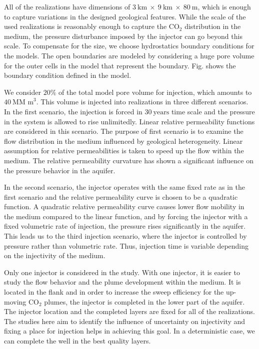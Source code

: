 All of the realizations have dimensions of $3~\mbox{km}~\times~9~\mbox{km}~\times~80~\mbox{m}$, which is enough to capture variations in the designed geological features. While the scale of the used realizations is reasonably enough to capture the $\mbox{CO}_2$ distribution in the medium, the pressure disturbance imposed by the injector can go beyond this scale. To compensate for the size, we choose hydrostatics boundary conditions for the models. The open boundaries are modeled by considering a huge pore volume for the outer cells in the model that represent the boundary. Fig. shows the boundary condition defined in the model.

We consider $20\%$ of the total model pore volume for injection, which amounts to $40~\mbox{MM m}^3$. This volume is injected into realizations in three different scenarios. In the first scenario, the injection is forced in $30~\mbox{years}$ time scale and the pressure in the system is allowed to rise unlimitedly. Linear relative permeability functions are considered in this scenario. The purpose of first scenario is to examine the flow distribution in the medium influenced by geological heterogeneity. Linear assumption for relative permeabilities is taken to speed up the flow within the medium. The relative permeability curvature has shown a significant influence on the pressure behavior in the  aquifer. 

In the second scenario, the injector operates with the same fixed rate as in the first scenario and the relative permeability curve is chosen to be a quadratic function. A quadratic relative permeability curve causes lower flow mobility in the medium compared to the linear function, and by forcing the injector with a fixed volumetric rate of injection, the pressure rises significantly in the aquifer. This leads us to the third injection scenario, where the injector is controlled by pressure rather than volumetric rate. Thus, injection time is variable depending on the injectivity of the medium.

Only one injector is considered in the study. With one injector, it is easier to study the flow behavior and the plume development within the medium. It is located in the flank and in order to increase the sweep efficiency for the up-moving $\mbox{CO}_2$ plumes, the injector is completed in the lower part of the aquifer. The injector location and the completed layers are fixed for all of the realizations. The studies here aim to identify the influence of uncertainty on injectivity and fixing a place for injection helps in achieving this goal. In a deterministic case, we can complete the well in the best quality layers. 

